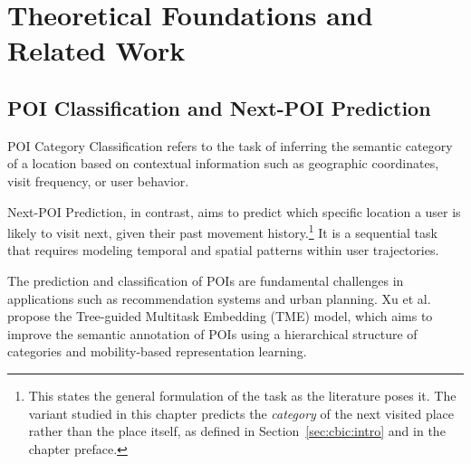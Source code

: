 \section{Theoretical Foundations and Related Work}
\label{sec:cbic:related}

\subsection{POI Classification and Next-POI Prediction}
POI Category Classification refers to the task of inferring the semantic category of a location based on contextual information such as geographic coordinates, visit frequency, or user behavior.

Next-POI Prediction, in contrast, aims to predict which specific location a user is likely to visit next, given their past movement history.\footnote{This states the general formulation of the task as the literature poses it. The variant studied in this chapter predicts the \emph{category} of the next visited place rather than the place itself, as defined in Section~\ref{sec:cbic:intro} and in the chapter preface.} It is a sequential task that requires modeling temporal and spatial patterns within user trajectories.

The prediction and classification of POIs are fundamental challenges in applications such as recommendation systems and urban planning. Xu et al.~\cite{Xu2023} propose the Tree-guided Multitask Embedding (TME) model, which aims to improve the semantic annotation of POIs using a hierarchical structure of categories and mobility-based representation learning.

